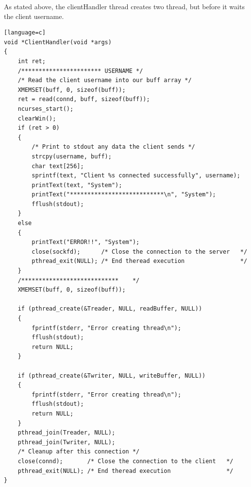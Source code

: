 \documentclass[a4paper,12pt]{report}
\begin{document}
As stated above, the clientHandler thread creates two thread, but before it waits the client username.

\begin{lstlisting}[caption={clientHandler thread of TCP server},captionpos=b][language=c]
void *ClientHandler(void *args)
{
    int ret;
    /*********************** USERNAME */
    /* Read the client username into our buff array */
    XMEMSET(buff, 0, sizeof(buff));
    ret = read(connd, buff, sizeof(buff));
    ncurses_start();
    clearWin();
    if (ret > 0)
    {
        /* Print to stdout any data the client sends */
        strcpy(username, buff);
        char text[256];
        sprintf(text, "Client %s connected successfully", username);
        printText(text, "System");
        printText("***************************\n", "System");
        fflush(stdout);
    }
    else
    {
        printText("ERROR!!", "System");
        close(sockfd);      /* Close the connection to the server   */
        pthread_exit(NULL); /* End theread execution                */
    }
    /****************************    */
    XMEMSET(buff, 0, sizeof(buff));

    if (pthread_create(&Treader, NULL, readBuffer, NULL))
    {
        fprintf(stderr, "Error creating thread\n");
        fflush(stdout);
        return NULL;
    }

    if (pthread_create(&Twriter, NULL, writeBuffer, NULL))
    {
        fprintf(stderr, "Error creating thread\n");
        fflush(stdout);
        return NULL;
    }
    pthread_join(Treader, NULL);
    pthread_join(Twriter, NULL);
    /* Cleanup after this connection */
    close(connd);       /* Close the connection to the client   */
    pthread_exit(NULL); /* End theread execution                */
}

\end{lstlisting}
\end{document}
